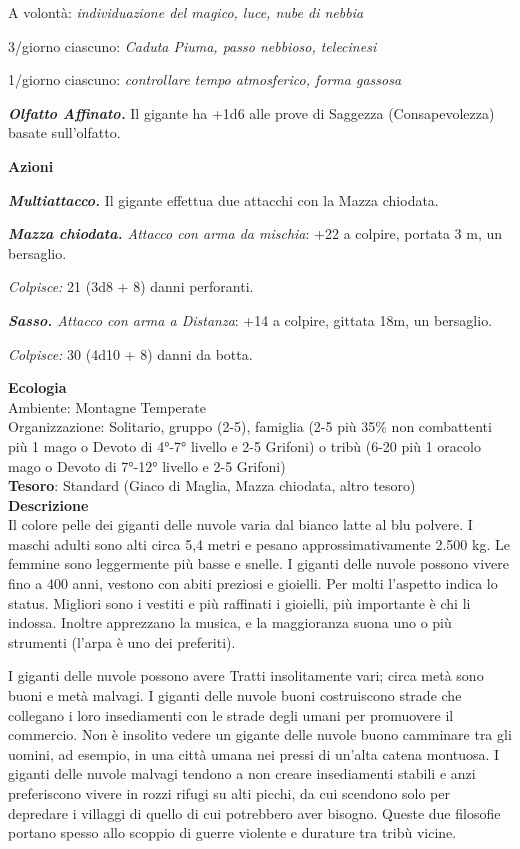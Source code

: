 \begin{multicols}{2}
	A volontà: \textit{individuazione del magico, luce, nube di nebbia}

	3/giorno ciascuno: \textit{Caduta Piuma, passo nebbioso, telecinesi}

	1/giorno ciascuno: \textit{controllare tempo atmosferico, forma gassosa}

	\textit{\textbf{Olfatto Affinato.}} Il gigante ha +1d6 alle prove di Saggezza (Consapevolezza) basate sull'olfatto.

	\textbf{Azioni}

	\textit{\textbf{Multiattacco.}} Il gigante effettua due attacchi con la Mazza chiodata.

	\textit{\textbf{Mazza chiodata.} Attacco con arma da mischia}: +22 a colpire, portata 3 m, un bersaglio.

	\textit{Colpisce:} 21 (3d8 + 8) danni perforanti.

	\textit{\textbf{Sasso.} Attacco con arma a Distanza}: +14 a colpire, gittata 18m, un bersaglio.

	\textit{Colpisce:} 30 (4d10 + 8) danni da botta.

	\textbf{Ecologia}\\
	Ambiente: Montagne Temperate\\
	Organizzazione: Solitario, gruppo (2-5), famiglia (2-5 più 35\% non combattenti più 1 mago o Devoto di 4°-7° livello e 2-5 Grifoni) o tribù (6-20 più 1 oracolo mago o Devoto di 7°-12° livello e 2-5 Grifoni)\\
	\textbf{Tesoro}: Standard (Giaco di Maglia, Mazza chiodata, altro tesoro)\\
	\textbf{Descrizione}\\
	Il colore pelle dei giganti delle nuvole varia dal bianco latte al blu polvere. I maschi adulti sono alti circa 5,4 metri e pesano approssimativamente 2.500 kg. Le femmine sono leggermente più basse e snelle. I giganti delle nuvole possono vivere fino a 400 anni, vestono con abiti preziosi e gioielli. Per molti l'aspetto indica lo status. Migliori sono i vestiti e più raffinati i gioielli, più importante è chi li indossa. Inoltre apprezzano la musica, e la maggioranza suona uno o più strumenti (l'arpa è uno dei preferiti).

	I giganti delle nuvole possono avere Tratti insolitamente vari; circa metà sono buoni e metà malvagi. I giganti delle nuvole buoni costruiscono strade che collegano i loro insediamenti con le strade degli umani per promuovere il commercio. Non è insolito vedere un gigante delle nuvole buono camminare tra gli uomini, ad esempio, in una città umana nei pressi di un'alta catena montuosa. I giganti delle nuvole malvagi tendono a non creare insediamenti stabili e anzi preferiscono vivere in rozzi rifugi su alti picchi, da cui scendono solo per depredare i villaggi di quello di cui potrebbero aver bisogno. Queste due filosofie portano spesso allo scoppio di guerre violente e durature tra tribù vicine.


\end{multicols}
